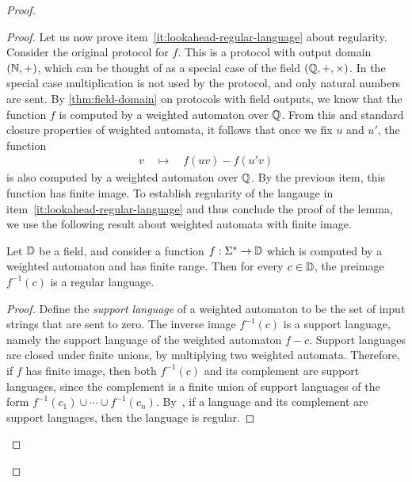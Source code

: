 \begin{proof}
\begin{proof}
  
  Let us now prove item~\ref{it:lookahead-regular-language} about regularity.
  Consider the original protocol for $f$. This is a protocol with output domain $({\mathbb N},+)$, which can be thought of as a special case of  the field $({\mathbb Q},+, \times)$. In the special case multiplication is not used by the protocol, and only natural numbers are sent. By \cref{thm:field-domain} on protocols with field outputs, we know that the function $f$ is computed by a weighted automaton over ${\mathbb Q}$. From this and standard closure properties of weighted automata, it follows that once we fix $u$ and $u'$,  the function 
  \begin{align*}
  v \quad \mapsto \quad f(uv) - f(u' v)
  \end{align*}
  is also computed by a weighted automaton over ${\mathbb Q}$. By the previous item, this function has finite image. To establish regularity of the langauge in item~\ref{it:lookahead-regular-language} and thus conclude the proof of the lemma, we use the following result about weighted automata with finite image.
  \begin{claim}
    Let $\mathbb D$ be a field, and consider a function $f : \Sigma^* \to \mathbb D$ which is computed by a weighted automaton and has finite range. Then for every $c \in \mathbb D$, the preimage $f^{-1}(c)$ is a regular language.
  \end{claim}
  \begin{proof}
    Define the \emph{support language} of a weighted automaton to be the set of input strings that are sent to zero. The inverse image $f^{-1}(c)$ is a support language, namely the support language of the weighted automaton $f-c$.  Support languages are closed under finite unions, by multiplying two weighted automata. Therefore, if $f$ has finite image, then both $f^{-1}(c)$ and its complement are support languages, since the complement is a finite union of support languages of the form $f^{-1}(c_1) \cup \cdots \cup f^{-1}(c_n)$. By~\cite[Theorem 3.1]{restivo1984cancellation}, if a language and its complement are support languages, then the language is regular.
  \end{proof}
\end{proof}


\end{proof}
